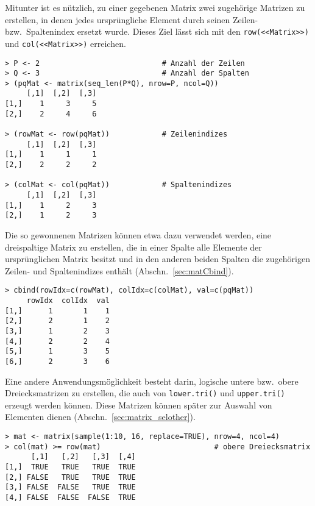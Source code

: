Mitunter ist es nützlich, zu einer gegebenen Matrix zwei zugehörige Matrizen zu erstellen, in denen jedes ursprüngliche Element durch seinen Zeilen- bzw.\ Spaltenindex ersetzt wurde. Dieses Ziel lässt sich mit den \lstinline!row(<<Matrix>>)! und \lstinline!col(<<Matrix>>)! erreichen.
\begin{lstlisting}
> P <- 2                            # Anzahl der Zeilen
> Q <- 3                            # Anzahl der Spalten
> (pqMat <- matrix(seq_len(P*Q), nrow=P, ncol=Q))
     [,1]  [,2]  [,3]
[1,]    1     3     5
[2,]    2     4     6

> (rowMat <- row(pqMat))            # Zeilenindizes
     [,1]  [,2]  [,3]
[1,]    1     1     1
[2,]    2     2     2

> (colMat <- col(pqMat))            # Spaltenindizes
     [,1]  [,2]  [,3]
[1,]    1     2     3
[2,]    1     2     3
\end{lstlisting}

Die so gewonnenen Matrizen können etwa dazu verwendet werden, eine dreispaltige Matrix zu erstellen, die in einer Spalte alle Elemente der ursprünglichen Matrix besitzt und in den anderen beiden Spalten die zugehörigen Zeilen- und Spaltenindizes enthält (Abschn.\ \ref{sec:matCbind}).
\begin{lstlisting}
> cbind(rowIdx=c(rowMat), colIdx=c(colMat), val=c(pqMat))
     rowIdx  colIdx  val
[1,]      1       1    1
[2,]      2       1    2
[3,]      1       2    3
[4,]      2       2    4
[5,]      1       3    5
[6,]      2       3    6
\end{lstlisting}

Eine andere Anwendungsmöglichkeit besteht darin, logische untere bzw.\ obere Dreiecksmatrizen zu erstellen, die auch von \lstinline!lower.tri()! und \lstinline!upper.tri()! erzeugt werden können. Diese Matrizen können später zur Auswahl von Elementen dienen (Abschn.\ \ref{sec:matrix_selother}).
\begin{lstlisting}
> mat <- matrix(sample(1:10, 16, replace=TRUE), nrow=4, ncol=4)
> col(mat) >= row(mat)                          # obere Dreiecksmatrix
      [,1]   [,2]   [,3]  [,4]
[1,]  TRUE   TRUE   TRUE  TRUE
[2,] FALSE   TRUE   TRUE  TRUE
[3,] FALSE  FALSE   TRUE  TRUE
[4,] FALSE  FALSE  FALSE  TRUE
\end{lstlisting}

